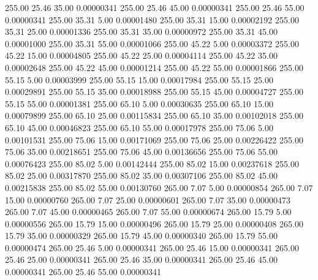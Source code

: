     255.00     25.46     35.00     0.00000341
    255.00     25.46     45.00     0.00000341
    255.00     25.46     55.00     0.00000341
    255.00     35.31      5.00     0.00001480
    255.00     35.31     15.00     0.00002192
    255.00     35.31     25.00     0.00001336
    255.00     35.31     35.00     0.00000972
    255.00     35.31     45.00     0.00001000
    255.00     35.31     55.00     0.00001066
    255.00     45.22      5.00     0.00003372
    255.00     45.22     15.00     0.00004805
    255.00     45.22     25.00     0.00004114
    255.00     45.22     35.00     0.00002648
    255.00     45.22     45.00     0.00001214
    255.00     45.22     55.00     0.00001866
    255.00     55.15      5.00     0.00003999
    255.00     55.15     15.00     0.00017984
    255.00     55.15     25.00     0.00029891
    255.00     55.15     35.00     0.00018988
    255.00     55.15     45.00     0.00004727
    255.00     55.15     55.00     0.00001381
    255.00     65.10      5.00     0.00030635
    255.00     65.10     15.00     0.00079899
    255.00     65.10     25.00     0.00115834
    255.00     65.10     35.00     0.00102018
    255.00     65.10     45.00     0.00046823
    255.00     65.10     55.00     0.00017978
    255.00     75.06      5.00     0.00101531
    255.00     75.06     15.00     0.00171069
    255.00     75.06     25.00     0.00226422
    255.00     75.06     35.00     0.00218651
    255.00     75.06     45.00     0.00136656
    255.00     75.06     55.00     0.00076423
    255.00     85.02      5.00     0.00142444
    255.00     85.02     15.00     0.00237618
    255.00     85.02     25.00     0.00317870
    255.00     85.02     35.00     0.00307106
    255.00     85.02     45.00     0.00215838
    255.00     85.02     55.00     0.00130760
    265.00      7.07      5.00     0.00000854
    265.00      7.07     15.00     0.00000760
    265.00      7.07     25.00     0.00000601
    265.00      7.07     35.00     0.00000473
    265.00      7.07     45.00     0.00000465
    265.00      7.07     55.00     0.00000674
    265.00     15.79      5.00     0.00000556
    265.00     15.79     15.00     0.00000496
    265.00     15.79     25.00     0.00000408
    265.00     15.79     35.00     0.00000329
    265.00     15.79     45.00     0.00000340
    265.00     15.79     55.00     0.00000474
    265.00     25.46      5.00     0.00000341
    265.00     25.46     15.00     0.00000341
    265.00     25.46     25.00     0.00000341
    265.00     25.46     35.00     0.00000341
    265.00     25.46     45.00     0.00000341
    265.00     25.46     55.00     0.00000341
